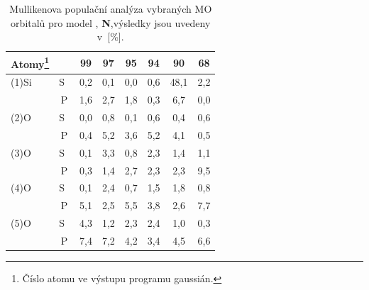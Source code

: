 \documentclass[
digital, %
table,   %
lof,     %
lot,     %
oneside,
]{fithesis3}
\begin{document}
\begin{table}[H]\begin{minipage}{\textwidth}
\caption{Mullikenova populační analýza vybraných MO orbitalů pro model , \textbf{N},výsledky jsou uvedeny v~[\%].}
\begin{center}
\begin{tabular}{|l|c|c|c|c|c|c|c|}
\hline
Atomy\footnote{Číslo atomu ve výstupu programu gaussián.}  \label{si_model_orezany_MPA} &  & 99 & 97 & 95 & 94 & 90 & 68 \\ \hline
(1)Si & S~& 0,2  & 0,1  & 0,0  & 0,6  & 48,1  & 2,2  \\ \hline
& P & 1,6  & 2,7  & 1,8  & 0,3  & 6,7  & 0,0  \\ \hline
(2)O & S~& 0,0  & 0,8  & 0,1  & 0,6  & 0,4  & 0,6  \\ \hline
& P & 0,4  & 5,2  & 3,6  & 5,2  & 4,1  & 0,5  \\ \hline
(3)O & S~& 0,1  & 3,3  & 0,8  & 2,3  & 1,4  & 1,1  \\ \hline
& P & 0,3  & 1,4  & 2,7  & 2,3  & 2,3  & 9,5  \\ \hline
(4)O & S~& 0,1  & 2,4  & 0,7  & 1,5  & 1,8  & 0,8  \\ \hline
& P & 5,1  & 2,5  & 5,5  & 3,8  & 2,6  & 7,7  \\ \hline
(5)O & S~& 4,3  & 1,2  & 2,3  & 2,4  & 1,0  & 0,3  \\ \hline
& P & 7,4  & 7,2  & 4,2  & 3,4  & 4,5  & 6,6 \\ \hline
\end{tabular}
\end{center}\end{minipage}\end{table}
\end{document}
